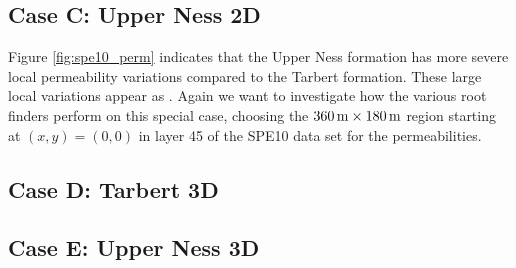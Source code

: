 

\clearpage
\subsection{Case C: Upper Ness 2D}
\label{section:caseC}
Figure \ref{fig:spe10_perm} indicates that the Upper Ness formation has more severe local permeability variations compared to the Tarbert formation. These large local variations appear as . Again we want to investigate how the various root finders perform on this special case, choosing the $\unit[360]{m}\times \unit[180]{m}$ region starting at $(x,y) = (0,0)$ in layer 45 of the SPE10 data set for the permeabilities.








\clearpage
\subsection{Case D: Tarbert 3D}
\label{section:caseD}


\clearpage
\subsection{Case E: Upper Ness 3D}
\label{section:caseE}


\clearpage
